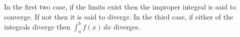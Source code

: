 \documentclass[12pt, a4paper]{article}
\begin{document}
\begin{mdremark}
    In the first two case, if the limits exist then the improper integral is said to converge. If not then it is said to diverge. In the third case, if either of the integrals diverge then \(\int_{a}^{b} f(x) \, dx\) diverges.
\end{mdremark}


\end{document}
